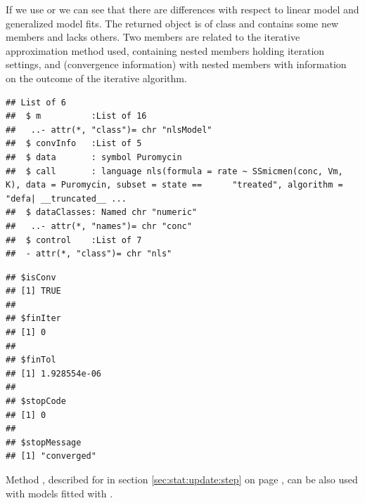 \documentclass[krantz2]{krantz}\usepackage{knitr}
\begin{document}
\begin{explainbox}
If we use  or  we can see that there are differences with respect to linear model and generalized model fits. The returned object is of class  and contains some new members and lacks others. Two members are related to the iterative approximation method used,  containing nested members holding iteration settings, and  (convergence information) with nested members with information on the outcome of the iterative algorithm.

\begin{knitrout}\footnotesize
{}\color{fgcolor}\begin{kframe}
\begin{alltt}
  \hlstd{=} \hlstd{)}
\end{alltt}
\begin{verbatim}
## List of 6
##  $ m          :List of 16
##   ..- attr(*, "class")= chr "nlsModel"
##  $ convInfo   :List of 5
##  $ data       : symbol Puromycin
##  $ call       : language nls(formula = rate ~ SSmicmen(conc, Vm, K), data = Puromycin, subset = state ==      "treated", algorithm = "defa| __truncated__ ...
##  $ dataClasses: Named chr "numeric"
##   ..- attr(*, "names")= chr "conc"
##  $ control    :List of 7
##  - attr(*, "class")= chr "nls"
\end{verbatim}
\end{kframe}
\end{knitrout}

\begin{knitrout}\footnotesize
{}\color{fgcolor}\begin{kframe}
\begin{alltt}
\hlopt{$}
\end{alltt}
\begin{verbatim}
## $isConv
## [1] TRUE
## 
## $finIter
## [1] 0
## 
## $finTol
## [1] 1.928554e-06
## 
## $stopCode
## [1] 0
## 
## $stopMessage
## [1] "converged"
\end{verbatim}
\end{kframe}
\end{knitrout}
\end{explainbox}

Method , described for  in section \ref{sec:stat:update:step} on page \pageref{sec:stat:update:step}, can be also used with models fitted with .
\end{document}
